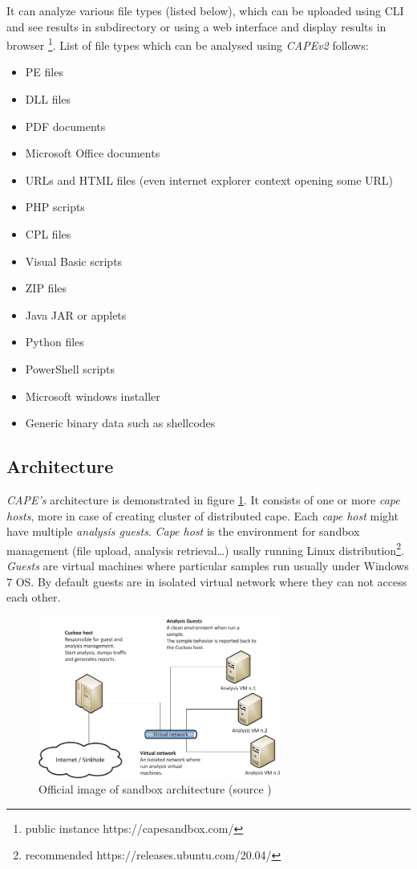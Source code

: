 It can analyze various file types (listed below), which can be uploaded using CLI and see results in subdirectory or using a web interface and display results in browser \footnote{public instance https://capesandbox.com/}. List of file types which can be analysed using \emph{CAPEv2} follows:
\begin{itemize}
  \item PE files
  \item DLL files
  \item PDF documents
  \item Microsoft Office documents
  \item URLs and HTML files (even internet explorer context opening some URL)
  \item PHP scripts
  \item CPL files
  \item Visual Basic scripts
  \item ZIP files
  \item Java JAR or applets
  \item Python files 
  \item PowerShell scripts
  \item Microsoft windows installer
  \item Generic binary data such as shellcodes
\end{itemize}


\subsection{Architecture}
\emph{CAPE's} architecture is demonstrated in figure \ref{fig:capearchitecture}. It consists of one or more \emph{cape hosts}, more in case of creating cluster of distributed cape. Each \emph{cape host} might have multiple \emph{analysis guests}. \emph{Cape host} is the environment for sandbox management (file upload, analysis retrieval\dots) usally running Linux distribution\footnote{recommended https://releases.ubuntu.com/20.04/}. \emph{Guests} are virtual machines where particular samples run usually under Windows 7 OS. By default guests are in isolated virtual network where they can not access each other.

\begin{figure}[h]
  \centering
  \includegraphics[width=8cm]{figures/architecture.png}
  \caption{Official image of sandbox architecture (source \cite{CAPESand75:online})}
  \label{fig:capearchitecture}
\end{figure}

